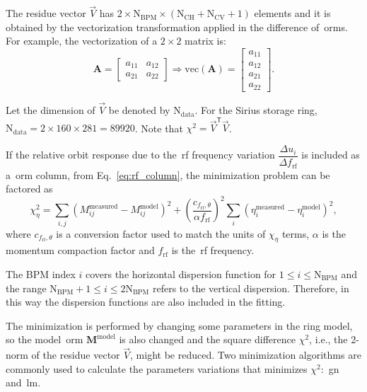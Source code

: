 The residue vector $\vec{V}$ has $2 \times \mathrm{N}_{\mathrm{BPM}} \times \left(\mathrm{N}_{\mathrm{CH}} + \mathrm{N}_{\mathrm{CV}}+1\right)$ elements and it is obtained by the vectorization transformation applied in the difference of~\gls{orm}s. For example, the vectorization of a $2 \times 2$ matrix is:
\begin{equation}
        \mathbf{A} = \begin{bmatrix}
     a_{11} & a_{12} \\
     a_{21} & a_{22} 
\end{bmatrix} \Rightarrow \mathrm{vec}\left(\mathbf{A}\right) = \begin{bmatrix}
     a_{11}  \\
     a_{12} \\
     a_{21} \\ 
     a_{22} 
\end{bmatrix}.
\end{equation}

Let the dimension of $\vec{V}$ be denoted by $\mathrm{N}_{\mathrm{data}}$. For the Sirius storage ring, $\mathrm{N}_{\mathrm{data}} = 2 \times 160 \times 281 = 89920$. Note that $\chi^2 = \vec{V}^{\mathsf{T}}\vec{V}$.

If the relative orbit response due to the~\gls{rf} frequency variation $\dfrac{\Delta u_i}{\Delta f_{\mathrm{rf}}}$ is included as a~\gls{orm} column, from Eq.~\eqref{eq:rf_column}, the minimization problem can be factored as
\begin{equation}
    \chi^2_{\eta} = \sum_{i, j} \left(M^{\mathrm{measured}}_{ij} - M^{\mathrm{model}}_{ij}\right)^2 + \left(\dfrac{c_{f_{\mathrm{rf}}, \theta}}{\alpha f_{\mathrm{rf}}}\right)^2\sum_{i}\left(\eta^{\mathrm{measured}}_{i} - \eta^{\mathrm{model}}_{i}\right)^2,
    \label{eq:chi2_disp}
\end{equation}
where $c_{f_{\mathrm{rf}}, \theta}$ is a conversion factor used to match the units of $\chi_{\eta}$ terms, $\alpha$ is the momentum compaction factor and $f_{\mathrm{rf}}$ is the~\gls{rf} frequency.

The BPM index $i$ covers the horizontal dispersion function for $1 \leq i \leq \mathrm{N}_{\mathrm{BPM}}$ and the range $\mathrm{N}_{\mathrm{BPM}}+1 \leq i \leq 2\mathrm{N}_{\mathrm{BPM}}$ refers to the vertical dispersion. Therefore, in this way the dispersion functions are also included in the fitting.

The minimization is performed by changing some parameters in the ring model, so the model~\gls{orm} $\mathbf{M}^{\mathrm{model}}$ is also changed and the square difference $\chi^2$, i.e., the 2-norm of the residue vector $\vec{V}$, might be reduced. Two minimization algorithms are commonly used to calculate the parameters variations that minimizes $\chi^2$:~\gls{gn} and~\gls{lm}.

